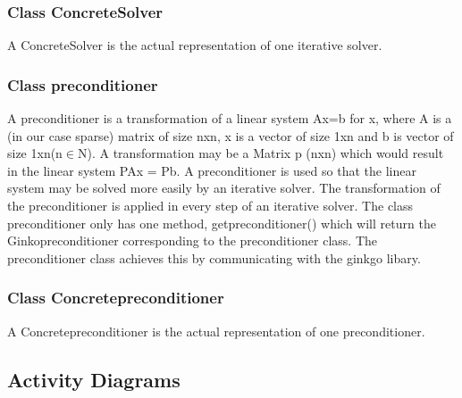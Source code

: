 \documentclass[parskip=full]{scrartcl}
\begin{document}
\subsubsection{Class ConcreteSolver}
A ConcreteSolver is the actual representation of one \gls{iterative solver}.

\subsubsection{Class \gls{preconditioner}}
A \gls{preconditioner} is a transformation of a linear system Ax=b for x, where A is a (in our case sparse) matrix of size nxn, x is a vector of size 1xn and b is vector of size 1xn(n$\in$N). A transformation may be a Matrix p (nxn) which would result in the linear system PAx = Pb. A \gls{preconditioner} is used so that the linear system may be solved more easily by an \gls{iterative solver}. The transformation of the \gls{preconditioner} is applied in every step of an \gls{iterative solver}. \newline\newline
The class \gls{preconditioner} only has one method, get\gls{preconditioner}() which will return the Ginko\gls{preconditioner} corresponding to the \gls{preconditioner} class. The \gls{preconditioner} class achieves this by communicating with the ginkgo libary.

\subsubsection{Class Concrete\gls{preconditioner}}
A Concrete\gls{preconditioner} is the actual representation of one \gls{preconditioner}.

\subsection{Activity Diagrams}
\end{document}
